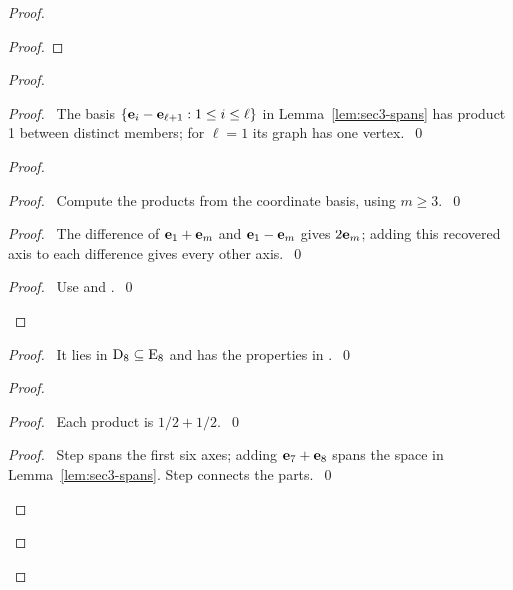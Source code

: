 \begin{proof}
\begin{proof}
 \end{proof}
 \begin{proof}
  \begin{proof}\pf\ The basis $\{{\mathbf e}_i-{\mathbf e}_{\ell+1}:1\leq i\leq\ell\}$ in
   Lemma~\ref{lem:sec3-spans} has product 1 between distinct members;
   for $\ell=1$ its graph has one vertex.~\qed\end{proof}
  \begin{proof}
   \begin{proof}\pf\ Compute the products from the coordinate basis, using $m\geq3$.~\qed\end{proof}
   \begin{proof}\pf\ The difference of ${\mathbf e}_1+{\mathbf e}_m$ and ${\mathbf e}_1-{\mathbf e}_m$
    gives $2{\mathbf e}_m$; adding this recovered axis to each difference gives every other axis.~\qed\end{proof}
   \qedstep
   \begin{proof}\pf\ Use  and .~\qed\end{proof}
  \end{proof}
  \begin{proof}\pf\ It lies in $\mathrm{D}_8\subseteq \mathrm{E}_8$ and has the properties in
   .~\qed\end{proof}
  \begin{proof}
   \begin{proof}\pf\ Each product is $1/2+1/2$.~\qed\end{proof}
   \qedstep
   \begin{proof}\pf\ Step  spans the first six axes;
    adding ${\mathbf e}_7+{\mathbf e}_8$ spans the space in Lemma~\ref{lem:sec3-spans}.
    Step  connects the parts.~\qed\end{proof}
  \end{proof}

\end{proof}
\end{proof}
